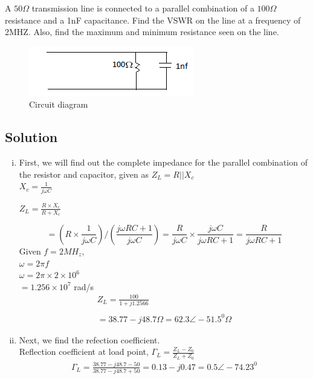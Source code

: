 \begin{example}
A $50\Omega$ transmission line is connected to a parallel combination of a $100\Omega$ resistance and a 1nF capacitance. Find the VSWR on the line at a frequency of 2MHZ. Also, find the maximum and minimum resistance seen on the line.

\begin{figure}[h]
\centering
\includegraphics[width=\linewidth]{./graphics/d1}
\caption{Circuit diagram}
\end{figure}

\subsection*{Solution}
\begin{enumerate}[(i)]
\item First, we will find out the complete impedance for the parallel combination of the resistor and capacitor, given as $Z_{L}=R||X_c$\\
$X_c =\frac{1}{j\omega C}$
\begin{center}
$Z_L=\frac{R \times X_c}{R + X_c}$

\end{center}
\begin{dmath*}
=(R\times\frac{1}{j\omega C})/(\frac{j\omega RC + 1}{j\omega C})=\frac{R}{j\omega C} \times \frac{j \omega C}{j\omega RC + 1}=\frac{R}{j\omega RC + 1}
\end{dmath*}
Given $f=2MH_{z}$,\\
$\omega = 2\pi f$\\
$\omega= 2\pi \times 2 \times 10^{6}$\\
$=1.256\times 10^{7}$ rad/s
\begin{align*}
Z_{L}=\frac{100}{1 + j1.2566}\\\\
= 38.77-j48.7\Omega = 62.3\angle-51.5^{0}\Omega
\end{align*}

\item Next, we find the refection coefficient.\\
Reflection coefficient at load point, $\Gamma_{L}=\frac{Z_{L}-Z_{0}}{Z_{L}+Z_{0}}$
\begin{align*}
\Gamma_{L} = \frac{38.77-j48.7-50}{38.77-j48.7+50}
=0.13-j0.47 = 0.5\angle-74.23^0
\end{align*}


\end{enumerate}
\end{example}
